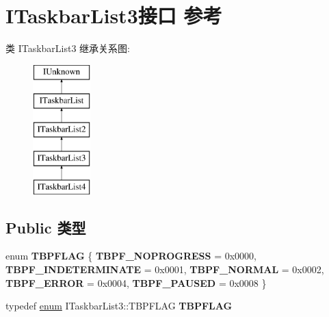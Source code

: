 \hypertarget{interface_i_taskbar_list3}{}\section{I\+Taskbar\+List3接口 参考}
\label{interface_i_taskbar_list3}
类 I\+Taskbar\+List3 继承关系图\+:\begin{figure}[H]
\begin{center}
\leavevmode
\includegraphics[height=5.000000cm]{interface_i_taskbar_list3}
\end{center}
\end{figure}
\subsection*{Public 类型}
\begin{DoxyCompactItemize}
\item 
\mbox{\label{interface_i_taskbar_list3_af847b8c43151a062d8fb363ccab64310}} 
enum {\bfseries T\+B\+P\+F\+L\+AG} \{ \newline
{\bfseries T\+B\+P\+F\+\_\+\+N\+O\+P\+R\+O\+G\+R\+E\+SS} = 0x0000, 
{\bfseries T\+B\+P\+F\+\_\+\+I\+N\+D\+E\+T\+E\+R\+M\+I\+N\+A\+TE} = 0x0001, 
{\bfseries T\+B\+P\+F\+\_\+\+N\+O\+R\+M\+AL} = 0x0002, 
{\bfseries T\+B\+P\+F\+\_\+\+E\+R\+R\+OR} = 0x0004, 
\newline
{\bfseries T\+B\+P\+F\+\_\+\+P\+A\+U\+S\+ED} = 0x0008
 \}
\item 
\mbox{\label{interface_i_taskbar_list3_a335b9c311e43ab7fa47ca7945d8d2e8a}} 
typedef \hyperlink{interfaceenum}{enum} I\+Taskbar\+List3\+::\+T\+B\+P\+F\+L\+AG {\bfseries T\+B\+P\+F\+L\+AG}
\end{DoxyCompactItemize}
